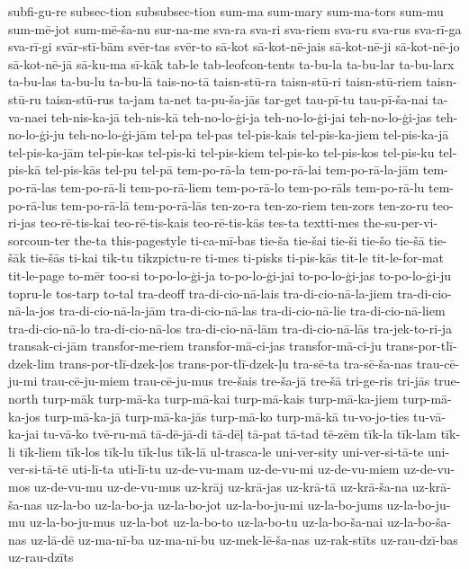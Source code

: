{subfi-gu-re
subsec-tion
subsubsec-tion
sum-ma
sum-mary
sum-ma-tors
sum-mu
sum-mē-jot
sum-mē-ša-nu
sur-na-me
sva-ra
sva-ri
sva-riem
sva-ru
sva-rus
sva-rī-ga
sva-rī-gi
svār-stī-bām
svēr-tas
svēr-to
sā-kot
sā-kot-nē-jais
sā-kot-nē-ji
sā-kot-nē-jo
sā-kot-nē-jā
sā-ku-ma
sī-kāk
tab-le
tab-leofcon-tents
ta-bu-la
ta-bu-lar
ta-bu-larx
ta-bu-las
ta-bu-lu
ta-bu-lā
tais-no-tā
taisn-stū-ra
taisn-stū-ri
taisn-stū-riem
taisn-stū-ru
taisn-stū-rus
ta-jam
ta-net
ta-pu-ša-jās
tar-get
tau-pī-tu
tau-pī-ša-nai
ta-va-naei
teh-nis-ka-jā
teh-nis-kā
teh-no-lo-ģi-ja
teh-no-lo-ģi-jai
teh-no-lo-ģi-jas
teh-no-lo-ģi-ju
teh-no-lo-ģi-jām
tel-pa
tel-pas
tel-pis-kais
tel-pis-ka-jiem
tel-pis-ka-jā
tel-pis-ka-jām
tel-pis-kas
tel-pis-ki
tel-pis-kiem
tel-pis-ko
tel-pis-kos
tel-pis-ku
tel-pis-kā
tel-pis-kās
tel-pu
tel-pā
tem-po-rā-la
tem-po-rā-lai
tem-po-rā-la-jām
tem-po-rā-las
tem-po-rā-li
tem-po-rā-liem
tem-po-rā-lo
tem-po-rāls
tem-po-rā-lu
tem-po-rā-lus
tem-po-rā-lā
tem-po-rā-lās
ten-zo-ra
ten-zo-riem
ten-zors
ten-zo-ru
teo-ri-jas
teo-rē-tis-kai
teo-rē-tis-kais
teo-rē-tis-kās
tes-ta
textti-mes
the-su-per-vi-sorcoun-ter
the-ta
this-pagestyle
ti-ca-mī-bas
tie-ša
tie-šai
tie-ši
tie-šo
tie-šā
tie-šāk
tie-šās
ti-kai
tik-tu
tikzpictu-re
ti-mes
ti-pisks
ti-pis-kās
tit-le
tit-le-for-mat
tit-le-page
to-mēr
too-si
to-po-lo-ģi-ja
to-po-lo-ģi-jai
to-po-lo-ģi-jas
to-po-lo-ģi-ju
topru-le
tos-tarp
to-tal
tra-deoff
tra-di-cio-nā-lais
tra-di-cio-nā-la-jiem
tra-di-cio-nā-la-jos
tra-di-cio-nā-la-jām
tra-di-cio-nā-las
tra-di-cio-nā-lie
tra-di-cio-nā-liem
tra-di-cio-nā-lo
tra-di-cio-nā-los
tra-di-cio-nā-lām
tra-di-cio-nā-lās
tra-jek-to-ri-ja
transak-ci-jām
transfor-me-riem
transfor-mā-ci-jas
transfor-mā-ci-ju
trans-por-tlī-dzek-lim
trans-por-tlī-dzek-ļos
trans-por-tlī-dzek-ļu
tra-sē-ta
tra-sē-ša-nas
trau-cē-ju-mi
trau-cē-ju-miem
trau-cē-ju-mus
tre-šais
tre-ša-jā
tre-šā
tri-ge-ris
tri-jās
true-north
turp-māk
turp-mā-ka
turp-mā-kai
turp-mā-kais
turp-mā-ka-jiem
turp-mā-ka-jos
turp-mā-ka-jā
turp-mā-ka-jās
turp-mā-ko
turp-mā-kā
tu-vo-jo-ties
tu-vā-ka-jai
tu-vā-ko
tvē-ru-mā
tā-dē-jā-di
tā-dēļ
tā-pat
tā-tad
tē-zēm
tīk-la
tīk-lam
tīk-li
tīk-liem
tīk-los
tīk-lu
tīk-lus
tīk-lā
ul-trasca-le
uni-ver-sity
uni-ver-si-tā-te
uni-ver-si-tā-tē
uti-lī-ta
uti-lī-tu
uz-de-vu-mam
uz-de-vu-mi
uz-de-vu-miem
uz-de-vu-mos
uz-de-vu-mu
uz-de-vu-mus
uz-krāj
uz-krā-jas
uz-krā-tā
uz-krā-ša-na
uz-krā-ša-nas
uz-la-bo
uz-la-bo-ja
uz-la-bo-jot
uz-la-bo-ju-mi
uz-la-bo-jums
uz-la-bo-ju-mu
uz-la-bo-ju-mus
uz-la-bot
uz-la-bo-to
uz-la-bo-tu
uz-la-bo-ša-nai
uz-la-bo-ša-nas
uz-lā-dē
uz-ma-nī-ba
uz-ma-nī-bu
uz-mek-lē-ša-nas
uz-rak-stīts
uz-rau-dzī-bas
uz-rau-dzīts
}
